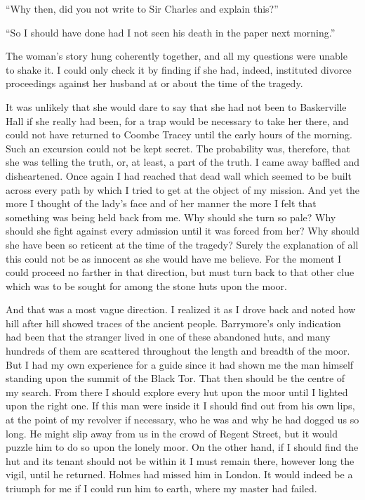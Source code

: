 \documentclass[paper=a5,BCOR=7mm,twoside,DIV=calc,12pt,usegeometry,openany,chapterprefix,endperiod,headings=big]{scrbook} %
\begin{document}
\enquote{Why then, did you not write to Sir Charles and explain this?}

\enquote{So I should have done had I not seen his death in the paper next morning.}

The woman's story hung coherently together, and all my questions were unable to shake it. I could only check it by finding if she had, indeed, instituted divorce proceedings against her husband at or about the time of the tragedy.


It was unlikely that she would dare to say that she had not been to Baskerville Hall if she really had been, for a trap would be necessary to take her there, and could not have returned to Coombe Tracey until the early hours of the morning. Such an excursion could not be kept secret. The probability was, therefore, that she was telling the truth, or, at least, a part of the truth. I came away baffled and disheartened. Once again I had reached that dead wall which seemed to be built across every path by which I tried to get at the object of my mission. And yet the more I thought of the lady's face and of her manner the more I felt that something was being held back from me. Why should she turn so pale? Why should she fight against every admission until it was forced from her? Why should she have been so reticent at the time of the tragedy? Surely the explanation of all this could not be as innocent as she would have me believe. For the moment I could proceed no farther in that direction, but must turn back to that other clue which was to be sought for among the stone huts upon the moor.

And that was a most vague direction. I realized it as I drove back and noted how hill after hill showed traces of the ancient people. Barrymore's only indication had been that the stranger lived in one of these abandoned huts, and many hundreds of them are scattered throughout the length and breadth of the moor. But I had my own experience for a guide since it had shown me the man himself standing upon the summit of the Black Tor. That then should be the centre of my search. From there I should explore every hut upon the moor until I lighted upon the right one. If this man were inside it I should find out from his own lips, at the point of my revolver if necessary, who he was and why he had dogged us so long. He might slip away from us in the crowd of Regent Street, but it would puzzle him to do so upon the lonely moor. On the other hand, if I should find the hut and its tenant should not be within it I must remain there, however long the vigil, until he returned. Holmes had missed him in London. It would indeed be a triumph for me if I could run him to earth, where my master had failed.
\end{document}
